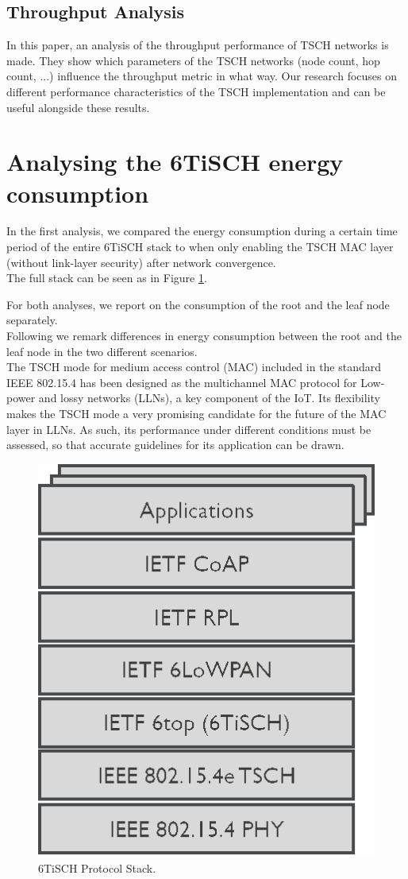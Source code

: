 \documentclass[conference]{IEEEtran}
\begin{document}
\subsection{Throughput Analysis} In this paper, an analysis of the throughput performance of TSCH networks is made. They show which parameters of the TSCH networks (node count, hop count, ...) influence the throughput metric in what way. Our research focuses on different performance characteristics of the TSCH implementation and can be useful alongside these results\cite{ThroughputEvaluation}. 

\section{Analysing the 6TiSCH energy consumption}
\label{section:task1}
In the first analysis, we compared the energy consumption during a certain time period of the entire 6TiSCH stack to when only enabling the TSCH MAC layer (without link-layer security) after network convergence.\\
The full stack can be seen as in Figure \ref{fig:6tischStack}.


For both analyses, we report on the consumption of the root and the leaf node separately.\\
Following we remark differences in energy consumption between the root and the leaf node in the two different scenarios.\\
The TSCH mode for medium access control (MAC) included in the standard IEEE 802.15.4 has been designed as the multichannel MAC protocol for Low-power and lossy networks (LLNs), a key component of the IoT. Its ﬂexibility makes the TSCH mode a very promising candidate for the future of the MAC layer in LLNs. As such, its performance under different conditions must be assessed, so that accurate guidelines for its application can be drawn\cite{TSCHExperimentEval}.
\begin{figure}[]
	\centering
	\includegraphics[width=.25\textwidth,keepaspectratio]{6TiSCH-Protocol-Stack.png}
	\caption{6TiSCH Protocol Stack\cite{TimeCritical6tisch}.}
	\label{fig:6tischStack}
\end{figure}
\end{document}
